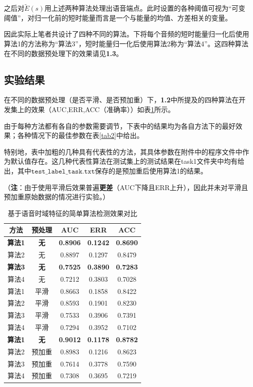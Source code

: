 \documentclass[a4paper]{article}
\begin{document}
\vspace{-1em}
之后对$\tilde{E}(s)$用上述两种算法处理出语音端点。此时设置的各种阈值可视为“可变阈值”，对归一化前的短时能量而言是一个与能量的均值、方差相关的变量。

因此实际上笔者共设计了四种不同的算法。下将每个音频的短时能量归一化后使用算法1的方法称为“算法3”，短时能量归一化后使用算法2称为“算法4”。这四种算法在不同的数据预处理下的效果请见\textbf{1.3}。

\subsection{实验结果}

在不同的数据预处理（是否平滑、是否预加重）下，\textbf{1.2}中所提及的四种算法在开发集上的效果（AUC,ERR,ACC（准确率））如表\ref{tab1}所示。

由于每种方法都有各自的参数需要调节，下表中的结果均为各自方法下的最好效果；各种情况下的最佳参数在表\ref{tab2}中给出。

特别地，表中加粗的几种具有代表性的方法，其具体参数在附件中的程序文件中作为默认值存在。这几种代表性算法在测试集上的测试结果在task1文件夹中均有给出，其中$\mathtt{test\_label\_task.txt}$保存的是预加重后使用算法1的结果。

（\textbf{注}：由于使用平滑后效果普遍\textbf{更差}（AUC下降且ERR上升），因此并未对平滑且预加重原始数据的情况进行实验。）

\newpage

\begin{table}[th]
  \centering
  \begin{tabular}{ c c c c c}
    \toprule
    \textbf{方法} & \textbf{预处理} & \textbf{AUC} & \textbf{ERR} & \textbf{ACC} \\
    \midrule
    \textbf{算法1} & \textbf{无} & \textbf{0.8906} & \textbf{0.1242} & \textbf{0.8690} \\
    算法2 & 无 & 0.8897 & 0.1297 & 0.8479 \\
    \textbf{算法3} & \textbf{无} & \textbf{0.7525} & \textbf{0.3890} & \textbf{0.7283}\\
    算法4 & 无 & 0.7212 & 0.3803 & 0.7028\\
    \midrule
    算法1 & 平滑 & 0.8663 & 0.1858 & 0.8422\\
    算法2 & 平滑 & 0.8593 & 0.1901 & 0.8230\\
    算法3 & 平滑 & 0.7533 & 0.3906 & 0.7391\\
    算法4 & 平滑 & 0.7294 & 0.3952 & 0.7102\\
    \midrule
    \textbf{算法1} & \textbf{无} & \textbf{0.9012} & \textbf{0.1178} & \textbf{0.8782} \\
    算法2 & 预加重 & 0.8983 & 0.1216 & 0.8623\\
    算法3 & 预加重 & 0.7614 & 0.3778 & 0.7590\\
    算法4 & 预加重 & 0.7308 & 0.3695 & 0.7219\\
    \bottomrule
  \end{tabular}
  \vspace{0.5em}
  \centering \caption{基于语音时域特征的简单算法检测效果对比}
  \label{tab1}
\end{table}
\end{document}

